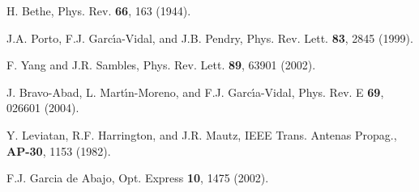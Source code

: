 \documentclass[aps,prl,twocolumn,showpacs,superscriptaddress,floatfix]{revtex4}
\begin{document}
\begin{thebibliography}{}
 H. Bethe, Phys. Rev. {\bf 66}, 163 (1944).

 J.A. Porto, F.J. Garc\'{\i}a-Vidal, and J.B. Pendry,
Phys. Rev. Lett. {\bf 83}, 2845 (1999).

 F. Yang and J.R. Sambles, Phys. Rev. Lett. {\bf
89}, 63901 (2002).

 J. Bravo-Abad, L. Mart\'{\i}n-Moreno, and F.J. Garc\'{\i}a-Vidal,
Phys. Rev. E {\bf 69}, 026601 (2004).

 Y. Leviatan, R.F. Harrington, and J.R. Mautz,
IEEE Trans. Antenas Propag., {\bf AP-30}, 1153 (1982).

 F.J. Garcia de Abajo, Opt. Express {\bf 10},
1475 (2002).


















\end{thebibliography}
\end{document}
